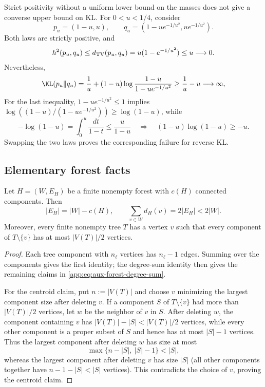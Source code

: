 \begin{remark}
\label{app:rem:no-hellinger-kl-converse}
Strict positivity without a uniform lower bound on the masses does not
give a converse upper bound on KL.  For $0<u<1/4$, consider
\[
 p_u=(1-u,u),\qquad
 q_u=(1-u e^{-1/u^2},u e^{-1/u^2}).
\]
Both laws are strictly positive, and
\[
 h^2(p_u,q_u)\le d_{\mathrm{TV}}(p_u,q_u)
 =u(1-e^{-1/u^2})\le u\longrightarrow0.
\]
Nevertheless,
\[
 \KLDivergence{p_u}{q_u}
 =\frac1u+(1-u)\log\frac{1-u}{1-u e^{-1/u^2}}
 \ge\frac1u-u\longrightarrow\infty,
\]
For the last inequality, $1-u e^{-1/u^2}\le1$ implies
$\log((1-u)/(1-u e^{-1/u^2}))\ge\log(1-u)$, while
\[
 -\log(1-u)=\int_0^u\frac{dt}{1-t}
 \le\frac{u}{1-u}
 \quad\Longrightarrow\quad (1-u)\log(1-u)\ge-u.
\]
Swapping the two laws proves the corresponding failure for reverse KL.
\end{remark}

\subsection{Elementary forest facts}
\label{app:auxiliary-forest}

\begin{lemma}
\label{app:lem:forest-basics}
Let $H=(W,E_H)$ be a finite nonempty forest with $c(H)$ connected
components.  Then
\begin{equation}
 |E_H|=|W|-c(H),
 \qquad
 \sum_{v\in W}d_H(v)=2|E_H|<2|W|.
 \label{app:eq:aux-forest-degree-sum}
\end{equation}
Moreover, every finite nonempty tree $T$ has a vertex $v$ such that every
component of $T\setminus\{v\}$ has at most $|V(T)|/2$ vertices.
\end{lemma}

\begin{proof}
Each tree component with $n_\ell$ vertices has $n_\ell-1$ edges.  Summing
over the components gives the first identity; the degree-sum identity then
gives the remaining claims in \eqref{app:eq:aux-forest-degree-sum}.

For the centroid claim, put $n:=|V(T)|$ and choose $v$ minimizing the largest component size
after deleting $v$.  If a component $S$ of $T\setminus\{v\}$ had more than
$|V(T)|/2$ vertices, let $w$ be the neighbor of $v$ in $S$.  After deleting
$w$, the component containing $v$ has $|V(T)|-|S|<|V(T)|/2$ vertices, while
every other component is a proper subset of $S$ and hence has at most
$|S|-1$ vertices.  Thus the largest component after deleting $w$ has size
at most
\[
 \max\{n-|S|,\ |S|-1\}<|S|,
\]
whereas the largest component after deleting $v$ has size $|S|$
(all other components together have $n-1-|S|<|S|$ vertices).
This contradicts the choice of $v$, proving the centroid claim.
\end{proof}


\ifincludeexponents

\fi
